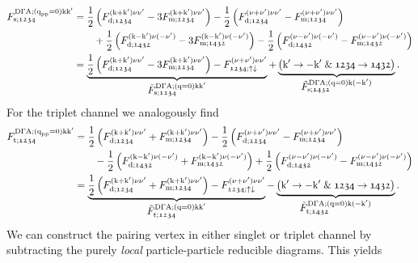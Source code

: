 \documentclass[../../main.tex]{subfiles}
\begin{document}
\begin{align}\label{eq:ladder_f_sing}
\begin{split}
	F_{\text{s};\mathfrak{1234}}^{\text{D}\Gamma\text{A};(\text{q}_{\text{pp}}=0)\text{k}\text{k}'}&=\frac12\left (F_{\text{d};\mathfrak{1234}}^{(\text{k}+\text{k}')\nu\nu'}-3F_{\text{m};\mathfrak{1234}}^{(\text{k}+\text{k}')\nu\nu'}\right )-\frac12\left (F_{\text{d};\mathfrak{1234}}^{(\nu+\nu')\nu\nu'}-F_{\text{m};\mathfrak{1234}}^{(\nu+\nu')\nu\nu'}\right )\\
	&\qquad+\frac12\left (F_{\text{d};\mathfrak{1432}}^{(\text{k}-\text{k}')\nu(-\nu')}-3F_{\text{m};\mathfrak{1432}}^{(\text{k}-\text{k}')\nu(-\nu')}\right )-\frac12\left (F_{\text{d};\mathfrak{1432}}^{(\nu-\nu')\nu(-\nu')}-F_{\text{m};\mathfrak{1432}}^{(\nu-\nu')\nu(-\nu')}\right )\\
	&=\underbrace{\frac12\left (F_{\text{d};\mathfrak{1234}}^{(\text{k}+\text{k}')\nu\nu'}-3F_{\text{m};\mathfrak{1234}}^{(\text{k}+\text{k}')\nu\nu'}\right )-F_{\mathfrak{1234};\uparrow\downarrow}^{(\nu+\nu')\nu\nu'}}_{\textstyle\tilde{F}_{\text{s};\mathfrak{1234}}^{\text{D}\Gamma\text{A};(\text{q}=0)\text{k}\text{k}'}}+ \underbrace{\left (\text{k}'\rightarrow -\text{k}'\;\&\; \mathfrak{1234}\rightarrow\mathfrak{1432}\right )}_{\textstyle\tilde{F}_{\text{s};\mathfrak{1432}}^{\text{D}\Gamma\text{A};(\text{q}=0)\text{k}(-\text{k}')}}.
\end{split}
\end{align}
For the triplet channel we analogously find
\begin{align}\label{eq:ladder_f_trip}
\begin{split}
	F_{\text{t};\mathfrak{1234}}^{\text{D}\Gamma\text{A};(\text{q}_{\text{pp}}=0)\text{k}\text{k}'}&=\frac12\left (F_{\text{d};\mathfrak{1234}}^{(\text{k}+\text{k}')\nu\nu'}+F_{\text{m};\mathfrak{1234}}^{(\text{k}+\text{k}')\nu\nu'}\right )-\frac12\left (F_{\text{d};\mathfrak{1234}}^{(\nu+\nu')\nu\nu'}-F_{\text{m};\mathfrak{1234}}^{(\nu+\nu')\nu\nu'}\right )\\
	&\qquad-\frac12\left (F_{\text{d};\mathfrak{1432}}^{(\text{k}-\text{k}')\nu(-\nu')}+F_{\text{m};\mathfrak{1432}}^{(\text{k}-\text{k}')\nu(-\nu')}\right )+\frac12\left (F_{\text{d};\mathfrak{1432}}^{(\nu-\nu')\nu(-\nu')}-F_{\text{m};\mathfrak{1432}}^{(\nu-\nu')\nu(-\nu')}\right )\\
	&=\underbrace{\frac12\left (F_{\text{d};\mathfrak{1234}}^{(\text{k}+\text{k}')\nu\nu'}+F_{\text{m};\mathfrak{1234}}^{(\text{k}+\text{k}')\nu\nu'}\right )-F_{\mathfrak{1234};\uparrow\downarrow}^{(\nu+\nu')\nu\nu'}}_{\textstyle\tilde{F}_{\text{t};\mathfrak{1234}}^{\text{D}\Gamma\text{A};(\text{q}=0)\text{k}\text{k}'}}-\underbrace{\left (\text{k}'\rightarrow -\text{k}'\;\&\; \mathfrak{1234}\rightarrow\mathfrak{1432}\right )}_{\textstyle\tilde{F}_{\text{t};\mathfrak{1432}}^{\text{D}\Gamma\text{A};(\text{q}=0)\text{k}(-\text{k}')}}.
\end{split}
\end{align}
We can construct the pairing vertex in either singlet or triplet channel by subtracting the purely \textit{local} particle-particle reducible diagrams. This yields
\end{document}
